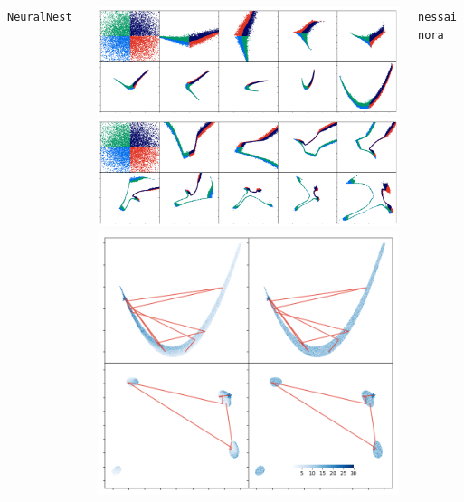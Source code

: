 \documentclass[aspectratio=169]{beamer}
\begin{document}
\begin{frame}
\begin{columns}[t]
        \vfill
        \texttt{NeuralNest}~
        \begin{columns}
            \includegraphics[width=\textwidth]{figures/rosenbrock_flow.png}
            \includegraphics[width=\textwidth]{figures/himmelblau_flow.png}
            \includegraphics[width=\textwidth]{figures/chains.png}
        \end{columns}
        \texttt{nessai}~ \texttt{nora}~
        \vfill

\end{columns}
\end{frame}
\end{document}
